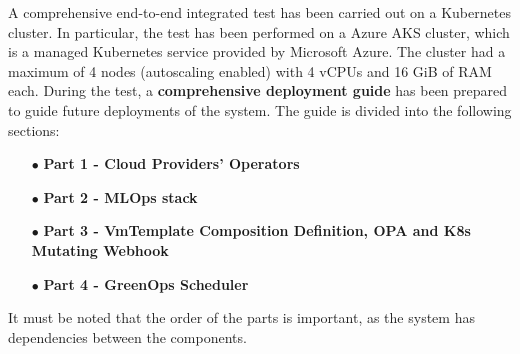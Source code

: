 A comprehensive end-to-end integrated test has been carried out on a Kubernetes cluster. 
In particular, the test has been performed on a Azure AKS cluster, which is a managed Kubernetes service provided by Microsoft Azure.
The cluster had a maximum of 4 nodes (autoscaling enabled) with 4 vCPUs and 16 GiB of RAM each.
During the test, a \textbf{comprehensive deployment guide} has been prepared to guide future deployments of the system.
The guide is divided into the following sections:
\begin{itemize}[itemsep=0.2pt, topsep=1pt]
    \item[$\bullet$] \textbf{Part 1 - Cloud Providers' Operators}
    \item[$\bullet$] \textbf{Part 2 - MLOps stack}
    \item[$\bullet$] \textbf{Part 3 - VmTemplate Composition Definition, OPA and K8s Mutating Webhook}
    \item[$\bullet$] \textbf{Part 4 - GreenOps Scheduler}
\end{itemize}

It must be noted that the order of the parts is important, as the system has dependencies between the components. \newline

